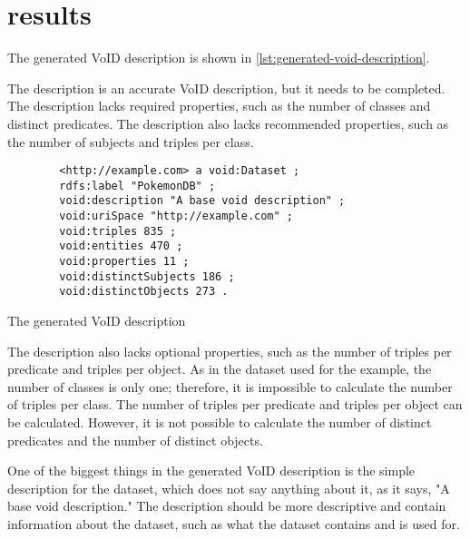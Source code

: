 \section{results} \label{sec:results}
The generated VoID description is shown in \autoref{lst:generated-void-description}.

The description is an accurate VoID description, but it needs to be completed. The description lacks required properties, such as the number of classes and distinct predicates. The description also lacks recommended properties, such as the number of subjects and triples per class.

\begin{listing}[!ht]
    \begin{verbatim}          
        <http://example.com> a void:Dataset ;
        rdfs:label "PokemonDB" ;
        void:description "A base void description" ;
        void:uriSpace "http://example.com" ;
        void:triples 835 ;
        void:entities 470 ;
        void:properties 11 ;
        void:distinctSubjects 186 ;
        void:distinctObjects 273 .
    \end{verbatim}
    \caption{The generated VoID description}
    \label{lst:generated-void-description}
\end{listing}

The description also lacks optional properties, such as the number of triples per predicate and triples per object. As in the dataset used for the example, the number of classes is only one; therefore, it is impossible to calculate the number of triples per class. The number of triples per predicate and triples per object can be calculated. However, it is not possible to calculate the number of distinct predicates and the number of distinct objects.

One of the biggest things in the generated VoID description is the simple description for the dataset, which does not say anything about it, as it says, "A base void description." The description should be more descriptive and contain information about the dataset, such as what the dataset contains and is used for.
